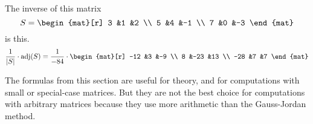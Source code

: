 \documentclass[10pt,t]{beamer}
\begin{document}
\begin{frame}
\ex  
The inverse of this matrix 
\begin{equation*}
  S=
  \begin{mat}[r]
    3 &1 &2 \\
    5 &4 &-1 \\
    7 &0 &-3
  \end{mat}
\end{equation*}
is this.
\begin{equation*}
  \frac{1}{\deter{S}}\cdot\adj(S)
  =
  \frac{1}{-84}
  \cdot
  \begin{mat}[r]
    -12 &3   &-9 \\
      8 &-23 &13 \\
    -28 &7   &7    
  \end{mat}
\end{equation*}

\pause
\medskip
\no
The formulas from this section are useful for theory, and for
computations with small or special-case matrices.
But they are
not the best choice for computations with arbitrary matrices
because they use more arithmetic than the 
Gauss-Jordan method.
\end{frame}



% 
\end{document}
